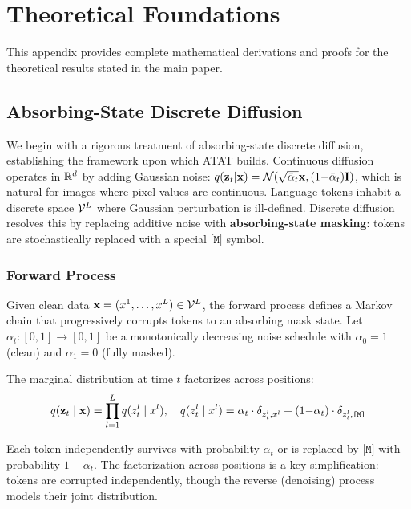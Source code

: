 \appendix
\onecolumn

\section{Theoretical Foundations}
\label{app:theory}

This appendix provides complete mathematical derivations and proofs for the theoretical results stated in the main paper.

\subsection{Absorbing-State Discrete Diffusion}
\label{app:discrete-diffusion}

We begin with a rigorous treatment of absorbing-state discrete diffusion, establishing the framework upon which ATAT builds. Continuous diffusion~\citep{ddpm,score_sde} operates in $\mathbb{R}^d$ by adding Gaussian noise: $q(\mathbf{z}_t|\mathbf{x}) = \mathcal{N}(\sqrt{\bar\alpha_t}\mathbf{x}, (1{-}\bar\alpha_t)\mathbf{I})$, which is natural for images where pixel values are continuous. Language tokens inhabit a discrete space $\mathcal{V}^L$ where Gaussian perturbation is ill-defined. Discrete diffusion resolves this by replacing additive noise with \textbf{absorbing-state masking}: tokens are stochastically replaced with a special $\texttt{[M]}$ symbol.

\subsubsection{Forward Process}

Given clean data $\mathbf{x} = (x^1, \ldots, x^L) \in \mathcal{V}^L$, the forward process defines a Markov chain that progressively corrupts tokens to an absorbing mask state. Let $\alpha_t: [0,1] \to [0,1]$ be a monotonically decreasing noise schedule with $\alpha_0 = 1$ (clean) and $\alpha_1 = 0$ (fully masked).

\begin{definition}
The marginal distribution at time $t$ factorizes across positions:
\begin{equation}
    q(\mathbf{z}_t \mid \mathbf{x}) = \prod_{l=1}^{L} q(z^l_t \mid x^l), \quad q(z^l_t \mid x^l) = \alpha_t \cdot \delta_{z^l_t, x^l} + (1{-}\alpha_t) \cdot \delta_{z^l_t, \texttt{[M]}}
\end{equation}
\end{definition}

Each token independently survives with probability $\alpha_t$ or is replaced by $\texttt{[M]}$ with probability $1{-}\alpha_t$. The factorization across positions is a key simplification: tokens are corrupted independently, though the reverse (denoising) process models their joint distribution.

